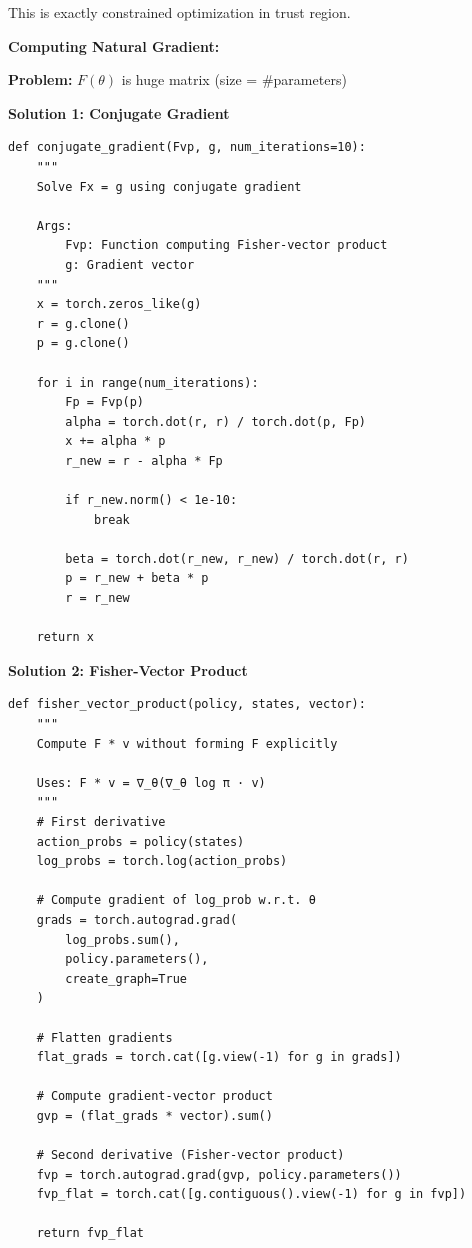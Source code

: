 \documentclass[12pt]{article}
\begin{document}
{{This is exactly constrained optimization in trust region.

\textbf{Computing Natural Gradient:}

\textbf{Problem:} $F(\theta)$ is huge matrix (size = #parameters)

\textbf{Solution 1: Conjugate Gradient}

\begin{verbatim}
def conjugate_gradient(Fvp, g, num_iterations=10):
    """
    Solve Fx = g using conjugate gradient
    
    Args:
        Fvp: Function computing Fisher-vector product
        g: Gradient vector
    """
    x = torch.zeros_like(g)
    r = g.clone()
    p = g.clone()
    
    for i in range(num_iterations):
        Fp = Fvp(p)
        alpha = torch.dot(r, r) / torch.dot(p, Fp)
        x += alpha * p
        r_new = r - alpha * Fp
        
        if r_new.norm() < 1e-10:
            break
            
        beta = torch.dot(r_new, r_new) / torch.dot(r, r)
        p = r_new + beta * p
        r = r_new
    
    return x
\end{verbatim}

\textbf{Solution 2: Fisher-Vector Product}

\begin{verbatim}
def fisher_vector_product(policy, states, vector):
    """
    Compute F * v without forming F explicitly
    
    Uses: F * v = ∇_θ(∇_θ log π · v)
    """
    # First derivative
    action_probs = policy(states)
    log_probs = torch.log(action_probs)
    
    # Compute gradient of log_prob w.r.t. θ
    grads = torch.autograd.grad(
        log_probs.sum(),
        policy.parameters(),
        create_graph=True
    )
    
    # Flatten gradients
    flat_grads = torch.cat([g.view(-1) for g in grads])
    
    # Compute gradient-vector product
    gvp = (flat_grads * vector).sum()
    
    # Second derivative (Fisher-vector product)
    fvp = torch.autograd.grad(gvp, policy.parameters())
    fvp_flat = torch.cat([g.contiguous().view(-1) for g in fvp])
    
    return fvp_flat
\end{verbatim}

}}
\end{document}
